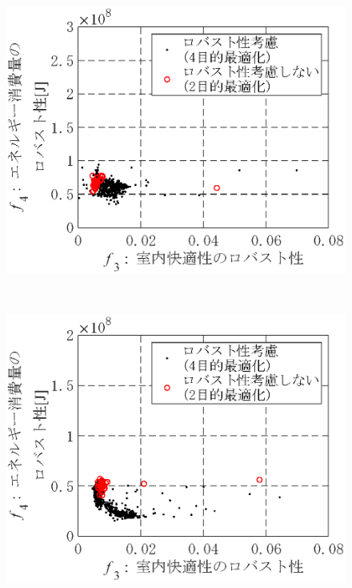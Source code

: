 \begin{figure}[htbp]
\begin{center}
\begin{minipage}{0.3\textwidth}
\begin{center}
            \end{center}
        \end{minipage}
        \begin{minipage}{0.3\textwidth}
            \begin{center}
                \includegraphics[width=1\textwidth,keepaspectratio=true]{fig/robust_result_pareto_f3f4_10_5.eps}\\\vspace{-3mm}{\small (e)上方誤差があった場合5}
            \end{center}
        \end{minipage}
        \\
        \begin{minipage}{0.3\textwidth}
            \begin{center}
                \includegraphics[width=1\textwidth,keepaspectratio=true]{fig/robust_result_pareto_f3f4_10_6.eps}\\\vspace{-3mm}{\small (f)下方誤差があった場合1}

\end{center}
\end{minipage}
\end{center}
\end{figure}
